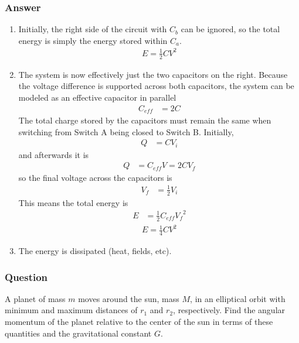 \subsubsection{Answer}
\begin{enumerate}
	\item
		Initially, the right side of the circuit with $C_b$ can be ignored,
		so the total energy is simply the energy stored within $C_a$.
		\begin{align}
			\boxed{
			E = \frac 12 CV^2
			}
		\end{align}
	\item
		The system is now effectively just the two capacitors on the right.
		Because the voltage difference is supported across both capacitors,
		the system can be modeled as an effective capacitor in parallel
		\begin{align*}
			C_{eff} &= 2C
		\end{align*}
		The total charge stored by the capacitors must remain the same when
		switching from Switch A being closed to Switch B. Initially,
		\begin{align*}
			Q &= CV_i
		\end{align*}
		and afterwards it is
		\begin{align*}
			Q &= C_{eff}V = 2CV_f
		\end{align*}
		so the final voltage across the capacitors is
		\begin{align*}
			V_f &= \frac 12 V_i
		\end{align*}
		This means the total energy is
		\begin{align*}
			E &= \frac 12 C_{eff} {V_f}^2
		\end{align*}
		\begin{align}
			\boxed{
			E = \frac 14 CV^2
			}
		\end{align}
	\item
		The energy is dissipated (heat, fields, etc).
\end{enumerate}

\subsubsection{Question}

A planet of mass $m$ moves around the sun, mass $M$, in an elliptical orbit
with minimum and maximum distances of $r_1$ and $r_2$, respectively. Find the
angular momentum of the planet relative to the center of the sun in terms of
these quantities and the gravitational constant $G$.

